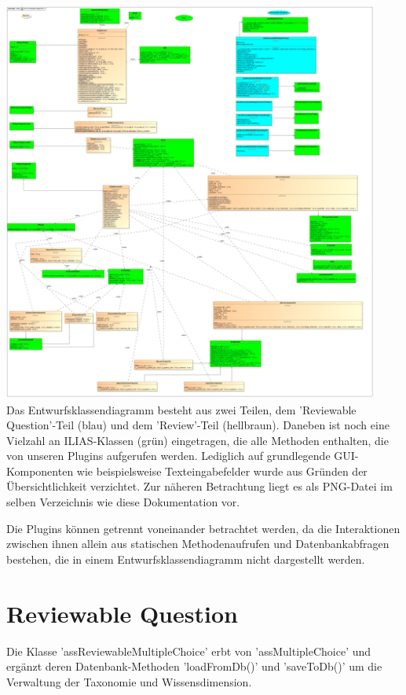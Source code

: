 \documentclass[a4paper]{scrreprt}
\begin{document}
\includegraphics[width=0.93\textwidth]{Class_Diagram__Entwurfsklassendiagramm.png}
\label{Entwurfsklassendiagramm}\\

Das Entwurfsklassendiagramm besteht aus zwei Teilen, dem 'Reviewable Question'-Teil (blau) und dem 'Review'-Teil (hellbraun). 
Daneben ist noch eine Vielzahl an ILIAS-Klassen (grün) eingetragen, die alle Methoden enthalten, die von unseren Plugins aufgerufen werden. 
Lediglich auf grundlegende GUI-Komponenten wie beispielsweise Texteingabefelder wurde aus Gründen der Übersichtlichkeit verzichtet. Zur näheren Betrachtung liegt es als PNG-Datei im selben Verzeichnis wie diese Dokumentation vor.

Die Plugins können getrennt voneinander betrachtet werden, da die Interaktionen zwischen ihnen allein aus statischen Methodenaufrufen und Datenbankabfragen bestehen, die in einem Entwurfsklassendiagramm nicht dargestellt werden.\\

\section{Reviewable Question}

Die Klasse 'assReviewableMultipleChoice' erbt von 'assMultipleChoice' und ergänzt deren Datenbank-Methoden 'loadFromDb()' und 'saveToDb()' um die Verwaltung der Taxonomie und Wissensdimension.\\
\end{document}
